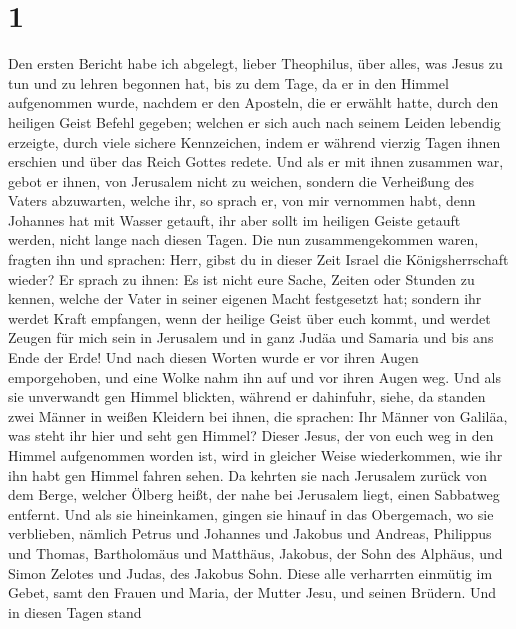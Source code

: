 \hypertarget{section}{%
\section{1}\label{section}}

 Den ersten Bericht habe ich abgelegt, lieber Theophilus,
über alles, was Jesus zu tun und zu lehren begonnen hat, 
bis zu dem Tage, da er in den Himmel aufgenommen wurde, nachdem er den
Aposteln, die er erwählt hatte, durch den heiligen Geist Befehl gegeben;
 welchen er sich auch nach seinem Leiden lebendig
erzeigte, durch viele sichere Kennzeichen, indem er während vierzig
Tagen ihnen erschien und über das Reich Gottes redete. 
Und als er mit ihnen zusammen war, gebot er ihnen, von Jerusalem nicht
zu weichen, sondern die Verheißung des Vaters abzuwarten, welche ihr, so
sprach er, von mir vernommen habt,  denn Johannes hat mit
Wasser getauft, ihr aber sollt im heiligen Geiste getauft werden, nicht
lange nach diesen Tagen.  Die nun zusammengekommen waren,
fragten ihn und sprachen: Herr, gibst du in dieser Zeit Israel die
Königsherrschaft wieder?  Er sprach zu ihnen: Es ist nicht
eure Sache, Zeiten oder Stunden zu kennen, welche der Vater in seiner
eigenen Macht festgesetzt hat;  sondern ihr werdet Kraft
empfangen, wenn der heilige Geist über euch kommt, und werdet Zeugen für
mich sein in Jerusalem und in ganz Judäa und Samaria und bis ans Ende
der Erde!  Und nach diesen Worten wurde er vor ihren Augen
emporgehoben, und eine Wolke nahm ihn auf und vor ihren Augen weg.
 Und als sie unverwandt gen Himmel blickten, während er
dahinfuhr, siehe, da standen zwei Männer in weißen Kleidern bei ihnen,
die sprachen:  Ihr Männer von Galiläa, was steht ihr hier
und seht gen Himmel? Dieser Jesus, der von euch weg in den Himmel
aufgenommen worden ist, wird in gleicher Weise wiederkommen, wie ihr ihn
habt gen Himmel fahren sehen.  Da kehrten sie nach
Jerusalem zurück von dem Berge, welcher Ölberg heißt, der nahe bei
Jerusalem liegt, einen Sabbatweg entfernt.  Und als sie
hineinkamen, gingen sie hinauf in das Obergemach, wo sie verblieben,
nämlich Petrus und Johannes und Jakobus und Andreas, Philippus und
Thomas, Bartholomäus und Matthäus, Jakobus, der Sohn des Alphäus, und
Simon Zelotes und Judas, des Jakobus Sohn.  Diese alle
verharrten einmütig im Gebet, samt den Frauen und Maria, der Mutter
Jesu, und seinen Brüdern.  Und in diesen Tagen stand
